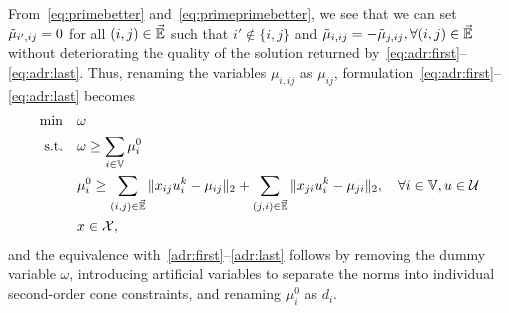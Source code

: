 \documentclass[12pt]{article}
\begin{document}
\begin{appendix}
From~\eqref{eq:primebetter} and~\eqref{eq:primeprimebetter}, we see that we can set $\tilde{\mu}_{i',ij}=0$ for all $(i,j)\in \Vec{\mathbb{E}}$ such that $i'\notin\{i,j\}$ and $\tilde{\mu}_{i,ij}=-\tilde{\mu}_{j,ij}, \forall(i,j)\in \Vec{\mathbb{E}}$ without deteriorating the quality of the solution returned by~\eqref{eq:adr:first}--\eqref{eq:adr:last}.
Thus, renaming the variables $\mu_{i,ij}$ as $\mu_{ij}$, formulation~\eqref{eq:adr:first}--\eqref{eq:adr:last} becomes
\begin{align*}
\min\quad & \omega \\
\mbox{s.t.}\quad & \omega \geq \sum_{i\in \mathbb{V}}\mu_i^0\\
& \mu_i^0 \geq \sum_{(i,j)\in \Vec{\mathbb{E}}} \|x_{ij}u_i^k-\mu_{ij}\|_2+\sum_{(j,i)\in \Vec{\mathbb{E}}} \|x_{ji}u_i^k-\mu_{ji}\|_2 , \quad\forall i\in \mathbb{V},u\in\mathcal{U}\\
& x \in \mathcal{X},\label{eq:adr:last}
\end{align*}
and the equivalence with~\eqref{adr:first}--\eqref{adr:last} follows by removing the dummy variable $\omega$, introducing artificial variables to separate the norms into individual second-order cone constraints, and renaming $\mu_i^0$ as $d_i$.
\end{appendix}







\end{document}
